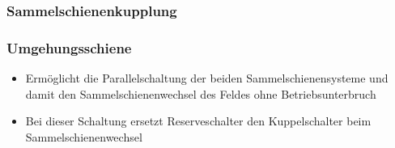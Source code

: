 \vspace{0.15cm}

\begin{minipage}[c]{0.48\columnwidth}
    \subsubsection{Sammelschienenkupplung}
\end{minipage}
\hfill
\begin{minipage}[c]{0.48\columnwidth}
    \subsubsection{Umgehungsschiene}
\end{minipage}

\begin{minipage}[c]{0.48\columnwidth}
    \begin{itemize}
        \item Ermöglicht die Parallelschaltung der beiden Sammelschienensysteme und damit den Sammelschienenwechsel des Feldes ohne Betriebsunterbruch
    \end{itemize}
\end{minipage}
\hfill
\begin{minipage}[c]{0.48\columnwidth}
    \begin{itemize}
        \item Bei dieser Schaltung ersetzt Reserveschalter den Kuppelschalter beim
        Sammelschienenwechsel
    \end{itemize}
\end{minipage}

\vspace{0.15cm}

